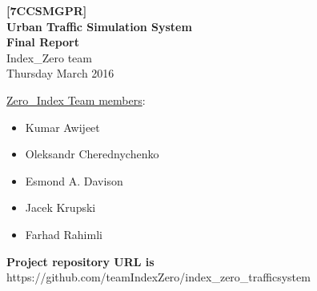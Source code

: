 \begin{titlepage}
    \begin{center}
        \vspace*{6cm}
        \noindent\makebox[\linewidth]{\rule{\paperwidth}{0.4pt}}
        \Huge
        \textbf{[7CCSMGPR]\\Urban Traffic Simulation System\\}
        \vspace{0.5cm}
        \Large
        \textbf{Final Report\\}
        \vspace{1.5cm}
        \large
        \textsf{Index\_Zero team\\}
        \vspace{1cm}
        \textsf{Thursday  March 2016}
        \noindent\makebox[\linewidth]{\rule{\paperwidth}{0.4pt}}
        \vfill
	\end{center}
    \vspace{1cm}
    \underline{\textsf{Zero\_Index Team members}}:
    \begin{itemize}
        \item Kumar Awijeet
        \item Oleksandr Cherednychenko
        \item Esmond A. Davison
        \item Jacek Krupski
        \item Farhad Rahimli
    \end{itemize}

    \vspace{1em}
    \textbf{Project repository URL is} https://github.com/teamIndexZero/index\_zero\_trafficsystem
\end{titlepage}